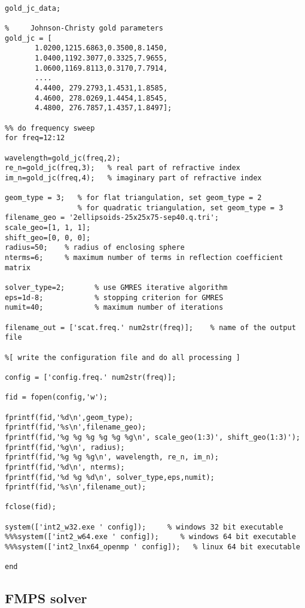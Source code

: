 \documentclass{article}
\begin{document}
\begin{verbatim}

gold_jc_data;   

%     Johnson-Christy gold parameters
gold_jc = [
       1.0200,1215.6863,0.3500,8.1450,
       1.0400,1192.3077,0.3325,7.9655,
       1.0600,1169.8113,0.3170,7.7914,
       ....
       4.4400, 279.2793,1.4531,1.8585,
       4.4600, 278.0269,1.4454,1.8545,
       4.4800, 276.7857,1.4357,1.8497];

%% do frequency sweep
for freq=12:12

wavelength=gold_jc(freq,2);  
re_n=gold_jc(freq,3);   % real part of refractive index
im_n=gold_jc(freq,4);   % imaginary part of refractive index

geom_type = 3;   % for flat triangulation, set geom_type = 2
                 % for quadratic triangulation, set geom_type = 3
filename_geo = '2ellipsoids-25x25x75-sep40.q.tri';
scale_geo=[1, 1, 1];
shift_geo=[0, 0, 0];
radius=50;    % radius of enclosing sphere
nterms=6;     % maximum number of terms in reflection coefficient matrix

solver_type=2;       % use GMRES iterative algorithm 
eps=1d-8;            % stopping criterion for GMRES
numit=40;            % maximum number of iterations 

filename_out = ['scat.freq.' num2str(freq)];    % name of the output file

%[ write the configuration file and do all processing ]

config = ['config.freq.' num2str(freq)];

fid = fopen(config,'w');

fprintf(fid,'%d\n',geom_type);
fprintf(fid,'%s\n',filename_geo);
fprintf(fid,'%g %g %g %g %g %g\n', scale_geo(1:3)', shift_geo(1:3)');
fprintf(fid,'%g\n', radius);
fprintf(fid,'%g %g %g\n', wavelength, re_n, im_n);
fprintf(fid,'%d\n', nterms);
fprintf(fid,'%d %g %d\n', solver_type,eps,numit);
fprintf(fid,'%s\n',filename_out);

fclose(fid);

system(['int2_w32.exe ' config]);     % windows 32 bit executable
%%%system(['int2_w64.exe ' config]);     % windows 64 bit executable
%%%system(['int2_lnx64_openmp ' config]);   % linux 64 bit executable

end
\end{verbatim}


\subsection{FMPS solver}
\end{document}
